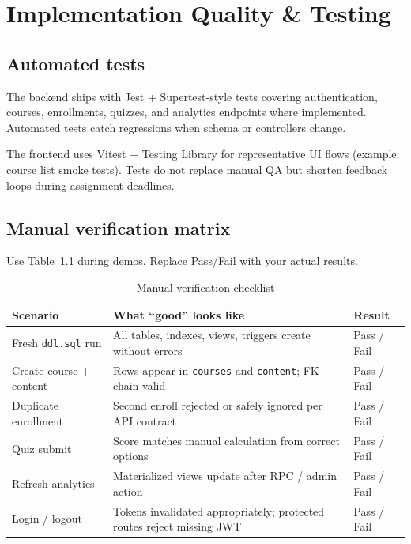 
\chapter{Implementation Quality \& Testing}
\label{ch:qa}

\section{Automated tests}
The backend ships with Jest + Supertest-style tests covering authentication, courses, enrollments, quizzes, and analytics endpoints where implemented. Automated tests catch regressions when schema or controllers change.

The frontend uses Vitest + Testing Library for representative UI flows (example: course list smoke tests). Tests do not replace manual QA but shorten feedback loops during assignment deadlines.

\section{Manual verification matrix}
Use Table~\ref{tab:manualqa} during demos. Replace Pass/Fail with your actual results.

\begin{longtable}{@{}p{4.2cm}p{7.8cm}p{2.2cm}@{}}
\caption{Manual verification checklist}\label{tab:manualqa}\\
\toprule
\textbf{Scenario} & \textbf{What ``good'' looks like} & \textbf{Result} \\
\midrule
Fresh \texttt{ddl.sql} run & All tables, indexes, views, triggers create without errors & Pass / Fail \\
Create course + content & Rows appear in \texttt{courses} and \texttt{content}; FK chain valid & Pass / Fail \\
Duplicate enrollment & Second enroll rejected or safely ignored per API contract & Pass / Fail \\
Quiz submit & Score matches manual calculation from correct options & Pass / Fail \\
Refresh analytics & Materialized views update after RPC / admin action & Pass / Fail \\
Login / logout & Tokens invalidated appropriately; protected routes reject missing JWT & Pass / Fail \\
\bottomrule
\end{longtable}

